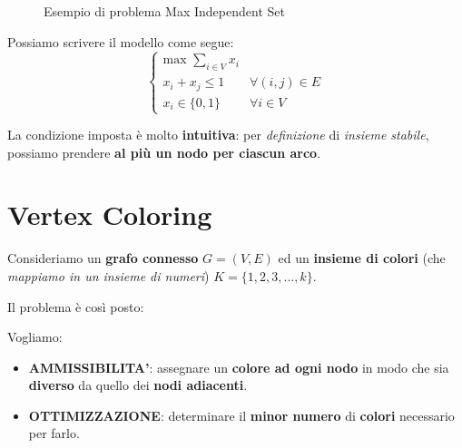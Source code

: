 \begin{figure}[!ht]
    \caption{Esempio di problema Max Independent Set}
\end{figure}

Possiamo scrivere il modello come segue:
\[
    \begin{cases}
        \text{max } \displaystyle\sum_{i\in V} x_i \\
        x_i + x_j \le 1 & \forall (i,j)\in E \\
        x_i \in \{0,1\} & \forall i \in V  
    \end{cases}
\]

\begin{remark}
    La condizione imposta è molto \textbf{intuitiva}: per \textit{definizione}
    di \textit{insieme stabile}, possiamo prendere 
    \textbf{al più un nodo per ciascun arco}.
\end{remark}

\section{Vertex Coloring}

Consideriamo un \textbf{grafo connesso} $G=(V,E)$ ed un \textbf{insieme di colori}
(che \textit{mappiamo in un insieme di numeri}) $K=\{1,2,3,\ldots,k\}$.

Il problema è così posto:

\begin{exa}
    Vogliamo:
    \begin{itemize}
        \item \textbf{AMMISSIBILITA'}: assegnare un \textbf{colore ad ogni nodo}
            in modo che sia \textbf{diverso} da quello dei \textbf{nodi adiacenti}.
        \item \textbf{OTTIMIZZAZIONE}: determinare il \textbf{minor numero}
            di \textbf{colori} necessario per farlo.
    \end{itemize}
\end{exa}

